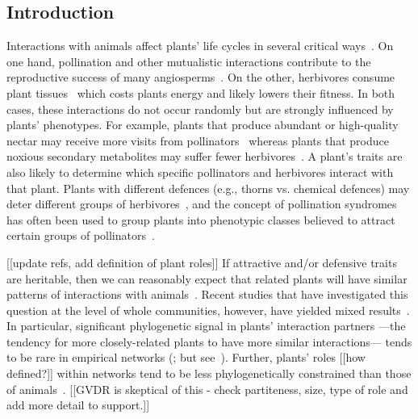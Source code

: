 \documentclass[12pt]{article}
\begin{document}
\begin{spacing}{1.5}

\section*{Introduction}
\linenumbers

  Interactions with animals affect plants' life cycles in several critical
  ways~\citep{Mayr2001,Sauve2015}. On one hand,
  pollination and other mutualistic interactions contribute
  to the reproductive success of many angiosperms~\citep{Ollerton2011}. 
  On the other, herbivores consume plant tissues~\citep{McCall2006} which
  costs plants energy and likely lowers their fitness.
  In both cases, these interactions do not occur randomly but
  are strongly influenced by plants' phenotypes. For example, plants that produce
  abundant or high-quality nectar may receive more visits from
  pollinators~\citep{Robertson1999} whereas plants that produce noxious secondary metabolites
  may suffer fewer herbivores~\citep{Johnson2014}. A plant's traits are also 
  likely to determine which specific pollinators and herbivores interact with that plant.
  Plants with different defences (e.g., thorns vs. chemical defences) may deter 
  different groups of herbivores~\citep{Ehrlich1964,Johnson2014}, and the concept
  of pollination syndromes has often been used to group plants into phenotypic
  classes believed to attract certain groups of pollinators~\citep{Waser1996,Fenster2004,Ollerton2009}.


  [[update refs, add definition of plant roles]]
  If attractive and/or defensive traits are heritable,
  then we can reasonably expect that related plants will have similar 
  patterns of interactions with animals~\citep{Schemske1999}.
  Recent studies that have investigated this question at the level of whole
  communities, however, have yielded mixed results~\citep{Rezende2007a,Gomez2010,Rohr2014a,Fontaine2015,Lind2015}.
  In particular, significant phylogenetic signal in plants' interaction partners
  ---the tendency for more closely-related plants to have more similar interactions---
  tends to be rare in empirical networks (\citealp{Rezende2007a,Lind2015}; but see~\citealp{Elias2013,Fontaine2015}).
  Further, plants' roles [[how defined?]] within networks tend to be less phylogenetically constrained than those of 
  animals~\citep{Rezende2007a,Chamberlain2014,Rohr2014,Vamosi2014,Lind2015}. [[GVDR is skeptical of this - check partiteness, size, type of role and add more detail to support.]]



\end{spacing}
\end{document}
